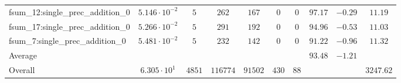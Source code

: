\begin{tabular}{|l|c|c|c|c|c|c|c|c|c|}
fsum\_12:single\_prec\_addition\_0             & $ 5.146 \cdot 10^{-2} $ & $ 5      $ & $ 262    $ & $ 167   $ & $ 0   $ & $ 0  $ & $ 97.17       $ & $ -0.29   $ & $ 11.19   $ \\
fsum\_17:single\_prec\_addition\_0             & $ 5.266 \cdot 10^{-2} $ & $ 5      $ & $ 291    $ & $ 192   $ & $ 0   $ & $ 0  $ & $ 94.96       $ & $ -0.53   $ & $ 11.03   $ \\
fsum\_7:single\_prec\_addition\_0              & $ 5.481 \cdot 10^{-2} $ & $ 5      $ & $ 232    $ & $ 142   $ & $ 0   $ & $ 0  $ & $ 91.22       $ & $ -0.96   $ & $ 11.32   $ \\
\hline
Average                                        & $                     $ & $        $ & $        $ & $       $ & $     $ & $    $ & $ 93.48       $ & $ -1.21   $ & $         $ \\
\hline
Overall                                        & $ 6.305 \cdot 10^{1}  $ & $ 4851   $ & $ 116774 $ & $ 91502 $ & $ 430 $ & $ 88 $ & $             $ & $         $ & $ 3247.62 $ \\
\hline
\end{tabular}
